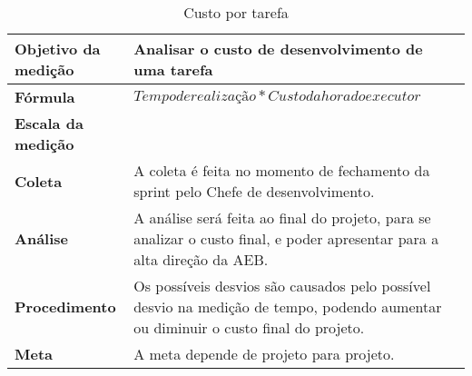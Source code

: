 \begin{table}[H]
\centering
\begin{tabular}{|p{4cm}|p{5cm}|}
\hline
	\textbf{Objetivo da medição} &
	Analisar o custo de desenvolvimento de uma tarefa
	\\ \hline
	\textbf{Fórmula} &
	$Tempo de realização * Custo da hora do executor$
	\\ \hline
	\textbf{Escala da medição} &

	\\ \hline
	\textbf{Coleta} &
	A coleta é feita no momento de fechamento da sprint pelo Chefe de desenvolvimento.
	\\ \hline
	\textbf{Análise} &
	A análise será feita ao final do projeto, para se analizar o custo final, e poder apresentar para a alta direção da AEB.
	\\ \hline
	\textbf{Procedimento} &
	Os possíveis desvios são causados pelo possível desvio na medição de tempo, podendo aumentar ou diminuir o custo final do projeto.
	\\ \hline
  \textbf{Meta} &
	A meta depende de projeto para projeto.
  \\ \hline
\end{tabular}
\caption{Custo por tarefa}
\label{tab:custo_por_tarefa}
\end{table}

